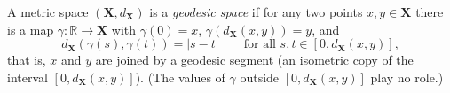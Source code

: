 \begin{definition}
A metric space $(\mathbf X, d_{\mathbf X})$ is a \emph{geodesic space} if for any two points $x, y\in \mathbf X$ there is a map $\gamma:\mathbb R\to \mathbf X$ with $\gamma(0)=x$, $\gamma(d_{\mathbf X}(x,y))=y$, and
\[
d_{\mathbf X}(\gamma(s),\gamma(t))=|s-t|\qquad\text{for all } s,t\in[0,d_{\mathbf X}(x,y)],
\]
that is, $x$ and $y$ are joined by a geodesic segment (an isometric copy of the interval $[0,d_{\mathbf X}(x,y)]$). (The values of $\gamma$ outside $[0,d_{\mathbf X}(x,y)]$ play no role.)
\end{definition}
